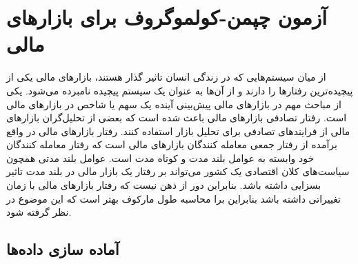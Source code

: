 \chapter{آزمون چپمن-کولموگروف برای بازارهای مالی}
\label{ch4} 

از میان سیستم‌هایی که در زندگی انسان تاثیر گذار هستند، 
بازارهای مالی یکی از پیچیده‌ترین رفتارها را دارند و از آن‌ها به عنوان 
یک سیستم پیچیده نامبرده می‌شود. یکی از مباحث مهم در 
بازارهای مالی پیش‌بینی آینده یک سهم یا شاخص در بازارهای مالی است. 
رفتار تصادفی بازارهای مالی باعث شده است که بعضی از تحلیل‌گران 
بازارهای مالی از فرایند‌های تصادفی برای تحلیل بازار استفاده کنند.\cite{paul_stochastic_2013}
رفتار بازارهای مالی در واقع برآمده از رفتار جمعی 
معامله کنندگان بازارهای مالی است که رفتار معامله کنندگان 
خود وابسته به عوامل بلند مدت و کوتاه مدت است. عوامل بلند مدتی همچون 
سیاست‌های کلان اقتصادی یک کشور می‌تواند بر رفتار یک بازار مالی در بلند 
مدت تاثیر بسزایی داشته باشد.
بنابراین دور از ذهن نیست که رفتار بازارهای مالی با زمان تغییراتی داشته باشد بنابراین 
برا محاسبه طول مارکوف بهتر است که این موضوع در نظر گرفته شود.

 \section{آماده سازی داده‌ها}

